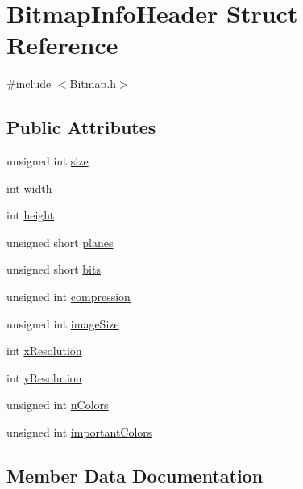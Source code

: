 \hypertarget{struct_bitmap_info_header}{}\section{Bitmap\+Info\+Header Struct Reference}
\label{struct_bitmap_info_header}


{\ttfamily \#include $<$Bitmap.\+h$>$}

\subsection*{Public Attributes}
\begin{DoxyCompactItemize}
\item 
unsigned int \hyperlink{struct_bitmap_info_header_a411fa70f6547a0360b33edcd3273d169}{size}
\item 
int \hyperlink{struct_bitmap_info_header_ac2034cfbada460819beed1ee24581c5d}{width}
\item 
int \hyperlink{struct_bitmap_info_header_aaa1d31efc13210020a38d435e4961df9}{height}
\item 
unsigned short \hyperlink{struct_bitmap_info_header_a9925e97e8bbc6b797afe2d22fbab45d6}{planes}
\item 
unsigned short \hyperlink{struct_bitmap_info_header_a1eebafc33573852f62a2e3d8adc25349}{bits}
\item 
unsigned int \hyperlink{struct_bitmap_info_header_a87fb38b0fe68db4bed899b9733d1b7e9}{compression}
\item 
unsigned int \hyperlink{struct_bitmap_info_header_a79bc984a7fd1c0f00ede6aa09143939f}{image\+Size}
\item 
int \hyperlink{struct_bitmap_info_header_a391cf1da75d16aee3b6539ccf5b29300}{x\+Resolution}
\item 
int \hyperlink{struct_bitmap_info_header_af2fadf9c216cc9f3ce401096e35be1b7}{y\+Resolution}
\item 
unsigned int \hyperlink{struct_bitmap_info_header_a4c543a08d1b72bdda2329b426a213e2a}{n\+Colors}
\item 
unsigned int \hyperlink{struct_bitmap_info_header_a9d87941fcc414085f7361fd89818ee3f}{important\+Colors}
\end{DoxyCompactItemize}


\subsection{Member Data Documentation}
\hypertarget{struct_bitmap_info_header_a1eebafc33573852f62a2e3d8adc25349}{}\label{struct_bitmap_info_header_a1eebafc33573852f62a2e3d8adc25349} 
